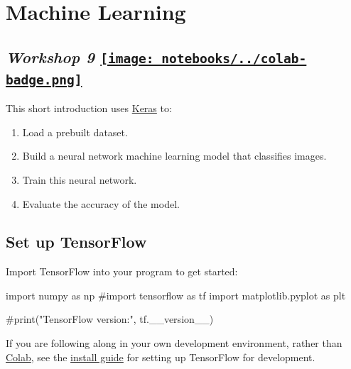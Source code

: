 \documentclass[
  letterpaper,
  DIV=11,
  numbers=noendperiod]{scrreprt}
\newenvironment{Shaded}{\begin{snugshade}}{\end{snugshade}}
\newcommand{\CommentTok}[1]{\textcolor[rgb]{0.37,0.37,0.37}{#1}}
\newcommand{\ImportTok}[1]{\textcolor[rgb]{0.00,0.46,0.62}{#1}}
\newcommand{\NormalTok}[1]{\textcolor[rgb]{0.00,0.23,0.31}{#1}}
\providecommand{\tightlist}{%
  \setlength{\itemsep}{0pt}\setlength{\parskip}{0pt}}\usepackage{longtable,booktabs,array}
\begin{document}

\hypertarget{machine-learning}{%
\chapter{Machine Learning}\label{machine-learning}}

\hypertarget{workshop-9-open-in-colab}{%
\section[\emph{Workshop 9} ]{\texorpdfstring{\emph{Workshop 9}
\href{https://colab.research.google.com/github/oballinger/QM2/blob/main/notebooks/W09.\%20Machine\%20Learning.ipynb}{\protect\texttt{[image: notebooks/../colab-badge.png]}}}{Workshop 9 Open In Colab}}\label{workshop-9-open-in-colab}}

This short introduction uses
\href{https://www.tensorflow.org/guide/keras/overview}{Keras} to:

\begin{enumerate}
\def\labelenumi{\arabic{enumi}.}
\tightlist
\item
  Load a prebuilt dataset.
\item
  Build a neural network machine learning model that classifies images.
\item
  Train this neural network.
\item
  Evaluate the accuracy of the model.
\end{enumerate}

\hypertarget{set-up-tensorflow}{%
\section{Set up TensorFlow}\label{set-up-tensorflow}}

Import TensorFlow into your program to get started:

\begin{Shaded}
\begin{Highlighting}[]
\ImportTok{import}\NormalTok{ numpy }\ImportTok{as}\NormalTok{ np}
\CommentTok{\#import tensorflow as tf}
\ImportTok{import}\NormalTok{ matplotlib.pyplot }\ImportTok{as}\NormalTok{ plt}

\CommentTok{\#print("TensorFlow version:", tf.\_\_version\_\_)}
\end{Highlighting}
\end{Shaded}

If you are following along in your own development environment, rather
than
\href{https://colab.research.google.com/github/tensorflow/docs/blob/master/site/en/tutorials/quickstart/beginner.ipynb}{Colab},
see the \href{https://www.tensorflow.org/install}{install guide} for
setting up TensorFlow for development.
\end{document}
